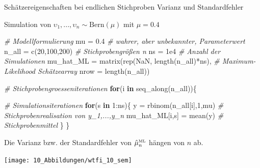\documentclass[
  8pt,
  ignorenonframetext,
]{beamer}
\newenvironment{Shaded}{\begin{snugshade}}{\end{snugshade}}
\newcommand{\AttributeTok}[1]{\textcolor[rgb]{0.77,0.63,0.00}{#1}}
\newcommand{\CommentTok}[1]{\textcolor[rgb]{0.56,0.35,0.01}{\textit{#1}}}
\newcommand{\ConstantTok}[1]{\textcolor[rgb]{0.00,0.00,0.00}{#1}}
\newcommand{\ControlFlowTok}[1]{\textcolor[rgb]{0.13,0.29,0.53}{\textbf{#1}}}
\newcommand{\DecValTok}[1]{\textcolor[rgb]{0.00,0.00,0.81}{#1}}
\newcommand{\FloatTok}[1]{\textcolor[rgb]{0.00,0.00,0.81}{#1}}
\newcommand{\FunctionTok}[1]{\textcolor[rgb]{0.00,0.00,0.00}{#1}}
\newcommand{\NormalTok}[1]{#1}
\newcommand{\OtherTok}[1]{\textcolor[rgb]{0.56,0.35,0.01}{#1}}
\newcommand{\SpecialCharTok}[1]{\textcolor[rgb]{0.00,0.00,0.00}{#1}}
\newcommand{\ups} {\upsilon}
\begin{document}
\begin{frame}[fragile]{\small Schätzereigenschaften bei endlichen
Stichproben \textbar{} Varianz und Standardfehler}
\protect\hypertarget{schuxe4tzereigenschaften-bei-endlichen-stichproben-varianz-und-standardfehler-3}{}
\vspace{1mm}
\small

Simulation von \(\ups_1,...,\ups_n \sim \mbox{Bern}(\mu)\) mit
\(\mu = 0.4\) \vspace{1mm}

\tiny
{}

\begin{Shaded}
\begin{Highlighting}[]
\CommentTok{\# Modellformulierung}
\NormalTok{mu          }\OtherTok{=} \FloatTok{0.4}                                   \CommentTok{\# wahrer, aber unbekannter, Parameterwert}
\NormalTok{n\_all       }\OtherTok{=} \FunctionTok{c}\NormalTok{(}\DecValTok{20}\NormalTok{,}\DecValTok{100}\NormalTok{,}\DecValTok{200}\NormalTok{)                         }\CommentTok{\# Stichprobengrößen n}
\NormalTok{ns          }\OtherTok{=} \FloatTok{1e4}                                   \CommentTok{\# Anzahl der Simulationen}
\NormalTok{mu\_hat\_ML   }\OtherTok{=} \FunctionTok{matrix}\NormalTok{(}\FunctionTok{rep}\NormalTok{(}\ConstantTok{NaN}\NormalTok{, }\FunctionTok{length}\NormalTok{(n\_all)}\SpecialCharTok{*}\NormalTok{ns),    }\CommentTok{\# Maximum{-}Likelihood Schätzearray}
                     \AttributeTok{nrow =} \FunctionTok{length}\NormalTok{(n\_all))}

\CommentTok{\# Stichprobengroesseniterationen}
\ControlFlowTok{for}\NormalTok{(i }\ControlFlowTok{in} \FunctionTok{seq\_along}\NormalTok{(n\_all))\{}

    \CommentTok{\# Simulationsiterationen}
    \ControlFlowTok{for}\NormalTok{(s }\ControlFlowTok{in} \DecValTok{1}\SpecialCharTok{:}\NormalTok{ns)\{}
\NormalTok{        y               }\OtherTok{=} \FunctionTok{rbinom}\NormalTok{(n\_all[i],}\DecValTok{1}\NormalTok{,mu)     }\CommentTok{\# Stichprobenrealisation von y\_1,...,y\_n}
\NormalTok{        mu\_hat\_ML[i,s]  }\OtherTok{=} \FunctionTok{mean}\NormalTok{(y)                   }\CommentTok{\# Stichprobenmittel}
\NormalTok{    \}}
\NormalTok{\}}
\end{Highlighting}
\end{Shaded}

\vspace{1mm}

\footnotesize

Die Varianz bzw. der Standardfehler von
\(\hat{\mu}^{\mbox{\tiny ML}}_n\) hängen von \(n\) ab.

\begin{center}\texttt{[image: 10\_Abbildungen/wtfi\_10\_sem]} \end{center}
\end{frame}
\end{document}

